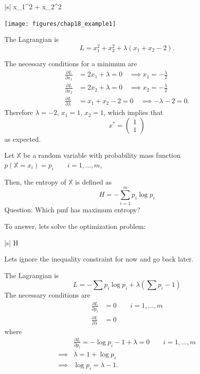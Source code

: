 \documentclass{article}
\begin{document}
\par{}
	\begin{mini*}|s|
		{}{x_1^2 + x_2^2}{}{}
	\end{mini*}
	\begin{center}
		\texttt{[image: figures/chap18\_example1]}
	\end{center}
	The Lagrangian is
	\[ 
		L = x_1^2 + x_2^2 + \lambda(x_1 + x_2 - 2). 
	\]	

	The necessary conditions for a minimum are
	\begin{align*}
		\frac{\partial L}{\partial x_1} &= 2x_1 + \lambda = 0 \quad \implies x_1 = -\frac{\lambda}{2}\\
		\frac{\partial L}{\partial x_2} &= 2x_2 + \lambda = 0 \quad \implies x_2 = -\frac{\lambda}{2}\\
		\frac{\partial L}{\partial \lambda} &= x_1 + x_2 - 2 = 0 \quad \implies -\lambda - 2 = 0.
	\end{align*}
	Therefore $\lambda = -2$, $x_1 = 1$, $x_2 = 1$, which implies that 
	\[
			x^{\ast} 
				= 
				\begin{pmatrix}
	      			1 \\ 1
	    		\end{pmatrix}
	\]
	as expected.	


\par{}
	Let $\mathbb{X}$ be a random variable with probability mass function $p(\mathbb{X}=x_i) = p_i \qquad i = 1, \ldots, m$,
	
	Then, the entropy of $\mathbb{X}$ is defined as
	\[ 
		H = -\sum_{i=1}^m p_i\log p_i 
	\]	
	Question:  Which pmf has maximum entropy?
	
	
	To answer, lets solve the optimization problem:
	\begin{maxi*}|s|
		{}{H}{}{}
	\end{maxi*}

	Lets ignore the inequality constraint for now and go back later.
	
	The Lagrangian is
	\[ 
		L = -\sum p_i \log p_i + \lambda(\sum p_i - 1) 
	\]
	The necessary conditions are
	\begin{align*}
		\frac{\partial L}{\partial p_i} &= 0 \qquad i = 1, \ldots, m\\
		\frac{\partial L}{\partial \lambda} &= 0
	\end{align*}
	where
	\begin{align*}
		& \frac{\partial L}{\partial p_i} = -\log p_i - 1 + \lambda = 0 \qquad i = 1, \ldots, m\\
		\implies & \lambda = 1+\log p_i\\
		\implies & \log p_i = \lambda - 1.
	\end{align*}	
\end{document}
